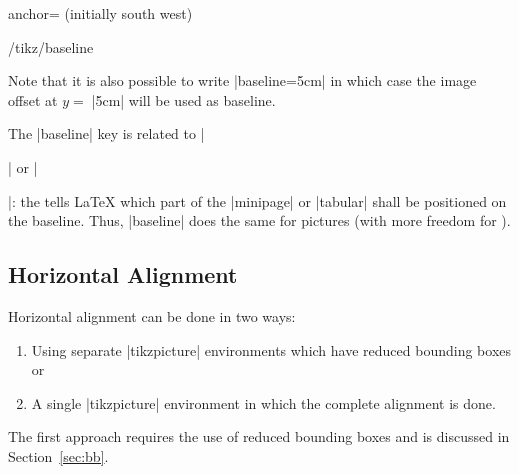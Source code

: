 \begin{pgfplotskey}{anchor= (initially south west)}
\begin{key}{/tikz/baseline}
\begin{codeexample}[]
\pgfplotsset{domain=-1:1}
%
    \hspace{0.15cm}
\end{codeexample}

        Note that it is also possible to write |baseline=5cm| in which case the
        image offset at $y=\;$|5cm| will be used as baseline.
    \end{key}

    The |baseline| key is related to |\begin{minipage}| or
    |\begin{tabular}|: the  tells \LaTeX{}
    which part of the |minipage| or |tabular| shall be positioned on the
    baseline. Thus, |baseline| does the same for pictures (with more freedom
    for ).


    \subsection{Horizontal Alignment}
    \label{sec:halign}

    Horizontal alignment can be done in two ways:
    \begin{enumerate}
        \item Using separate |tikzpicture| environments which have reduced
            bounding boxes or
        \item A single |tikzpicture| environment in which the complete
            alignment is done.
    \end{enumerate}
    The first approach requires the use of reduced bounding boxes and is
    discussed in Section~\ref{sec:bb}.


\end{tabular}
\end{minipage}
\end{pgfplotskey}
